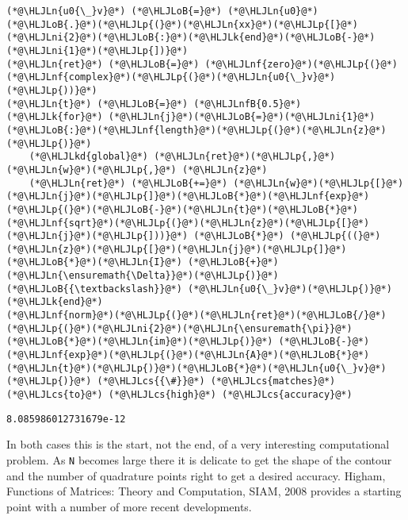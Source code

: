\documentclass[12pt,landscape]{article}
\newcommand{\HLJLk}[1]{\textcolor[RGB]{148,91,176}{\textbf{#1}}}
\newcommand{\HLJLkd}[1]{\textcolor[RGB]{214,102,97}{\textit{#1}}}
\newcommand{\HLJLn}[1]{#1}
\newcommand{\HLJLnf}[1]{\textcolor[RGB]{66,102,213}{#1}}
\newcommand{\HLJLnfB}[1]{\textcolor[RGB]{59,151,46}{#1}}
\newcommand{\HLJLni}[1]{\textcolor[RGB]{59,151,46}{#1}}
\newcommand{\HLJLoB}[1]{\textcolor[RGB]{102,102,102}{\textbf{#1}}}
\newcommand{\HLJLp}[1]{#1}
\newcommand{\HLJLcs}[1]{\textcolor[RGB]{153,153,119}{\textit{#1}}}
\begin{document}
{\begin{lstlisting}
(*@\HLJLn{u0{\_}v}@*) (*@\HLJLoB{=}@*) (*@\HLJLn{u0}@*)(*@\HLJLoB{.}@*)(*@\HLJLp{(}@*)(*@\HLJLn{xx}@*)(*@\HLJLp{[}@*)(*@\HLJLni{2}@*)(*@\HLJLoB{:}@*)(*@\HLJLk{end}@*)(*@\HLJLoB{-}@*)(*@\HLJLni{1}@*)(*@\HLJLp{])}@*)
(*@\HLJLn{ret}@*) (*@\HLJLoB{=}@*) (*@\HLJLnf{zero}@*)(*@\HLJLp{(}@*)(*@\HLJLnf{complex}@*)(*@\HLJLp{(}@*)(*@\HLJLn{u0{\_}v}@*)(*@\HLJLp{))}@*)
(*@\HLJLn{t}@*) (*@\HLJLoB{=}@*) (*@\HLJLnfB{0.5}@*)
(*@\HLJLk{for}@*) (*@\HLJLn{j}@*)(*@\HLJLoB{=}@*)(*@\HLJLni{1}@*)(*@\HLJLoB{:}@*)(*@\HLJLnf{length}@*)(*@\HLJLp{(}@*)(*@\HLJLn{z}@*)(*@\HLJLp{)}@*)
    (*@\HLJLkd{global}@*) (*@\HLJLn{ret}@*)(*@\HLJLp{,}@*) (*@\HLJLn{w}@*)(*@\HLJLp{,}@*) (*@\HLJLn{z}@*)
    (*@\HLJLn{ret}@*) (*@\HLJLoB{+=}@*) (*@\HLJLn{w}@*)(*@\HLJLp{[}@*)(*@\HLJLn{j}@*)(*@\HLJLp{]}@*)(*@\HLJLoB{*}@*)(*@\HLJLnf{exp}@*)(*@\HLJLp{(}@*)(*@\HLJLoB{-}@*)(*@\HLJLn{t}@*)(*@\HLJLoB{*}@*)(*@\HLJLnf{sqrt}@*)(*@\HLJLp{(}@*)(*@\HLJLn{z}@*)(*@\HLJLp{[}@*)(*@\HLJLn{j}@*)(*@\HLJLp{]))}@*) (*@\HLJLoB{*}@*) (*@\HLJLp{((}@*)(*@\HLJLn{z}@*)(*@\HLJLp{[}@*)(*@\HLJLn{j}@*)(*@\HLJLp{]}@*)(*@\HLJLoB{*}@*)(*@\HLJLn{I}@*) (*@\HLJLoB{+}@*) (*@\HLJLn{\ensuremath{\Delta}}@*)(*@\HLJLp{)}@*) (*@\HLJLoB{{\textbackslash}}@*) (*@\HLJLn{u0{\_}v}@*)(*@\HLJLp{)}@*)
(*@\HLJLk{end}@*)
(*@\HLJLnf{norm}@*)(*@\HLJLp{(}@*)(*@\HLJLn{ret}@*)(*@\HLJLoB{/}@*)(*@\HLJLp{(}@*)(*@\HLJLni{2}@*)(*@\HLJLn{\ensuremath{\pi}}@*)(*@\HLJLoB{*}@*)(*@\HLJLn{im}@*)(*@\HLJLp{)}@*) (*@\HLJLoB{-}@*) (*@\HLJLnf{exp}@*)(*@\HLJLp{(}@*)(*@\HLJLn{A}@*)(*@\HLJLoB{*}@*)(*@\HLJLn{t}@*)(*@\HLJLp{)}@*)(*@\HLJLoB{*}@*)(*@\HLJLn{u0{\_}v}@*)(*@\HLJLp{)}@*) (*@\HLJLcs{{\#}}@*) (*@\HLJLcs{matches}@*) (*@\HLJLcs{to}@*) (*@\HLJLcs{high}@*) (*@\HLJLcs{accuracy}@*)
\end{lstlisting}

\begin{lstlisting}
8.085986012731679e-12
\end{lstlisting}


In both cases this is the start, not the end, of a very interesting computational problem. As \texttt{N} becomes large there it is delicate to get the shape of the contour and the number of quadrature points right to get a desired accuracy. Higham, Functions of Matrices: Theory and Computation, SIAM, 2008 provides a starting point with a number of more recent developments.


}
\end{document}
